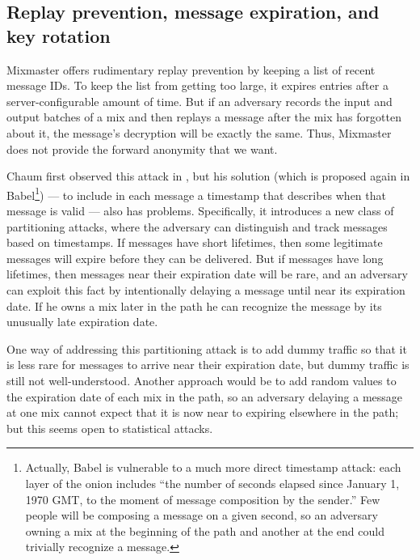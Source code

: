 \documentclass[final]{ieee}
\begin{document}
\subsection{Replay prevention, message expiration, and key rotation}
\label{subsec:replay}

Mixmaster offers rudimentary replay prevention by keeping a list of recent
message IDs. To keep the list from getting too large, it expires entries
after a server-configurable amount of time. But if an adversary records
the input and output batches of a mix and then replays a message after
the mix has forgotten about it, the message's decryption will be exactly
the same. Thus, Mixmaster does not provide the forward anonymity that we want.

Chaum first observed this attack in \cite{chaum-mix},
but his solution (which is proposed again in Babel\footnote{
  Actually, Babel is vulnerable to a much more direct timestamp attack:
  each layer of the onion includes ``the number of seconds
  elapsed since January 1, 1970 GMT, to the moment of message composition
  by the sender.'' Few people will be composing a message on a given
  second, so an adversary owning a mix at the beginning of the path and
  another at the end could trivially recognize a message.
}) --- to include in each message a timestamp that describes when that message
is valid --- also has problems. Specifically, it introduces a new class
of partitioning attacks, where the adversary can distinguish and
track messages based on timestamps.  If messages have short lifetimes,
then some legitimate messages will expire before they can be
delivered. But if messages have long lifetimes, then messages near
their expiration date will be rare, and an adversary can exploit
this fact by intentionally delaying a message until near its expiration
date. If he owns a mix later in the path he can
recognize the message by its unusually late expiration date.


One way of addressing this partitioning attack is to add dummy traffic
so that it is less rare for messages to arrive near their expiration date,
but dummy traffic is still not well-understood. Another approach would
be to add random values to the expiration date of each mix in the path,
so an adversary delaying a message at one mix cannot expect that it
is now near to expiring elsewhere in the path; but this seems open to
statistical attacks.

\end{document}
